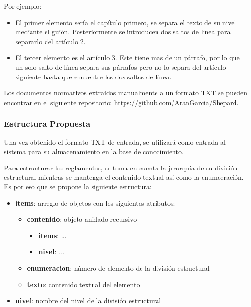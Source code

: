 Por ejemplo:

\begin{itemize}
    \item El primer elemento sería el capítulo primero, se separa el texto de su nivel mediante el guión. Posteriormente se introducen dos saltos de línea para separarlo del artículo 2. 
    \item El tercer elemento es el artículo 3. Este tiene mas de un párrafo, por lo que un solo salto de línea separa sus párrafos pero no lo separa del artículo siguiente hasta que encuentre los dos saltos de línea.
\end{itemize}

Los documentos normativos extraidos manualmente a un formato TXT se pueden encontrar en el siguiente repositorio: \url{https://github.com/AranGarcia/Shepard}.

\subsubsection{Estructura Propuesta}

Una vez obtenido el formato TXT de entrada, se utilizará como entrada al sistema para su almacenamiento en la base de conocimiento.

Para estructurar los reglamentos, se toma en cuenta la jerarquía de su división estructural mientras se mantenga el contenido textual así como la enumeeración. Es por eso que se propone la siguiente estructura:

\begin{itemize}
    \item \textbf{items}: arreglo de objetos con los siguientes atributos:
    
    \begin{itemize}
        \item \textbf{contenido}: objeto anidado recursivo
        
        \begin{itemize}
            \item \textbf{items}: ...
            \item \textbf{nivel}: ...
        \end{itemize}
        
        \item \textbf{enumeracion}: número de elemento de la división estructural
        \item \textbf{texto}: contenido textual del elemento
    \end{itemize}
    
    \item \textbf{nivel}: nombre del nivel de la división estructural
\end{itemize}

